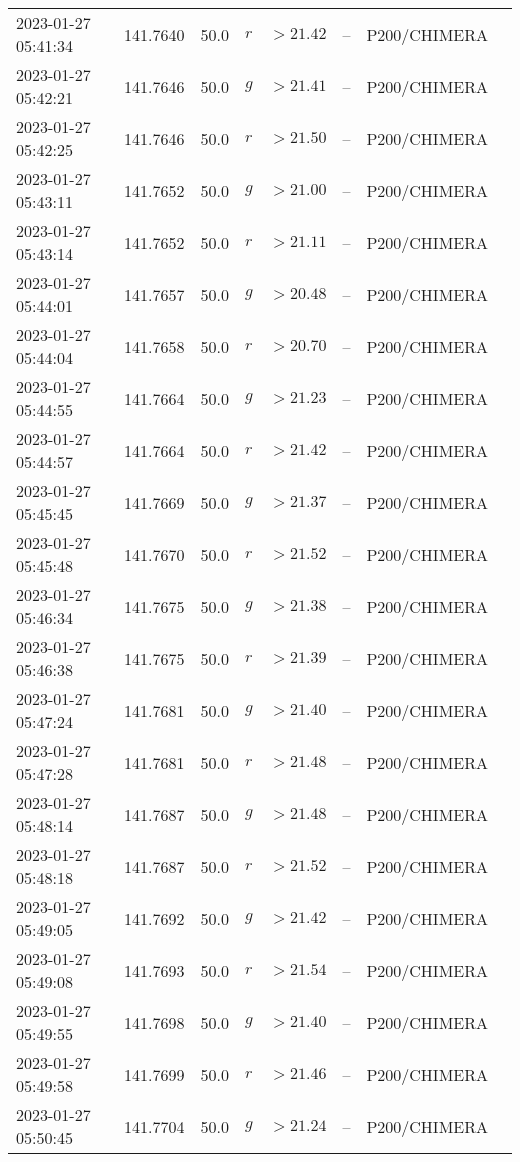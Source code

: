 \documentclass{nature_plusfigure}
\begin{document}
\begin{supplement}
\begin{center}
\begin{longtable}{llllllll}
2023-01-27 05:41:34 & 141.7640 & 50.0 & $r$ & $>21.42$ & -- & P200/CHIMERA &  \\ 
2023-01-27 05:42:21 & 141.7646 & 50.0 & $g$ & $>21.41$ & -- & P200/CHIMERA &  \\ 
2023-01-27 05:42:25 & 141.7646 & 50.0 & $r$ & $>21.50$ & -- & P200/CHIMERA &  \\ 
2023-01-27 05:43:11 & 141.7652 & 50.0 & $g$ & $>21.00$ & -- & P200/CHIMERA &  \\ 
2023-01-27 05:43:14 & 141.7652 & 50.0 & $r$ & $>21.11$ & -- & P200/CHIMERA &  \\ 
2023-01-27 05:44:01 & 141.7657 & 50.0 & $g$ & $>20.48$ & -- & P200/CHIMERA &  \\ 
2023-01-27 05:44:04 & 141.7658 & 50.0 & $r$ & $>20.70$ & -- & P200/CHIMERA &  \\ 
2023-01-27 05:44:55 & 141.7664 & 50.0 & $g$ & $>21.23$ & -- & P200/CHIMERA &  \\ 
2023-01-27 05:44:57 & 141.7664 & 50.0 & $r$ & $>21.42$ & -- & P200/CHIMERA &  \\ 
2023-01-27 05:45:45 & 141.7669 & 50.0 & $g$ & $>21.37$ & -- & P200/CHIMERA &  \\ 
2023-01-27 05:45:48 & 141.7670 & 50.0 & $r$ & $>21.52$ & -- & P200/CHIMERA &  \\ 
2023-01-27 05:46:34 & 141.7675 & 50.0 & $g$ & $>21.38$ & -- & P200/CHIMERA &  \\ 
2023-01-27 05:46:38 & 141.7675 & 50.0 & $r$ & $>21.39$ & -- & P200/CHIMERA &  \\ 
2023-01-27 05:47:24 & 141.7681 & 50.0 & $g$ & $>21.40$ & -- & P200/CHIMERA &  \\ 
2023-01-27 05:47:28 & 141.7681 & 50.0 & $r$ & $>21.48$ & -- & P200/CHIMERA &  \\ 
2023-01-27 05:48:14 & 141.7687 & 50.0 & $g$ & $>21.48$ & -- & P200/CHIMERA &  \\ 
2023-01-27 05:48:18 & 141.7687 & 50.0 & $r$ & $>21.52$ & -- & P200/CHIMERA &  \\ 
2023-01-27 05:49:05 & 141.7692 & 50.0 & $g$ & $>21.42$ & -- & P200/CHIMERA &  \\ 
2023-01-27 05:49:08 & 141.7693 & 50.0 & $r$ & $>21.54$ & -- & P200/CHIMERA &  \\ 
2023-01-27 05:49:55 & 141.7698 & 50.0 & $g$ & $>21.40$ & -- & P200/CHIMERA &  \\ 
2023-01-27 05:49:58 & 141.7699 & 50.0 & $r$ & $>21.46$ & -- & P200/CHIMERA &  \\ 
2023-01-27 05:50:45 & 141.7704 & 50.0 & $g$ & $>21.24$ & -- & P200/CHIMERA &  \\ 

\end{longtable}
\end{center}
\end{supplement}
\end{document}

